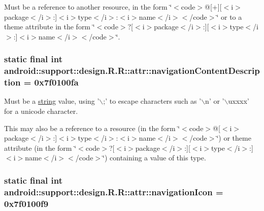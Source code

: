 Must be a reference to another resource, in the form \char`\"{}$<$code$>$@\mbox{[}+\mbox{]}\mbox{[}$<$i$>$package$<$/i$>$:\mbox{]}$<$i$>$type$<$/i$>$:$<$i$>$name$<$/i$>$$<$/code$>$\char`\"{} or to a theme attribute in the form \char`\"{}$<$code$>$?\mbox{[}$<$i$>$package$<$/i$>$:\mbox{]}\mbox{[}$<$i$>$type$<$/i$>$:\mbox{]}$<$i$>$name$<$/i$>$$<$/code$>$\char`\"{}. \hypertarget{classandroid_1_1support_1_1design_1_1_r_1_1attr_b1c90a8dd8e2806366f706aa845291fc}{
\subsubsection[{navigationContentDescription}]{\setlength{\rightskip}{0pt plus 5cm}static final int android::support::design.R.R::attr::navigationContentDescription = 0x7f0100fa}}
\label{classandroid_1_1support_1_1design_1_1_r_1_1attr_b1c90a8dd8e2806366f706aa845291fc}


Must be a \hyperlink{classandroid_1_1support_1_1design_1_1_r_1_1string}{string} value, using '$\backslash$;' to escape characters such as '$\backslash$n' or '$\backslash$uxxxx' for a unicode character. 

This may also be a reference to a resource (in the form \char`\"{}$<$code$>$@\mbox{[}$<$i$>$package$<$/i$>$:\mbox{]}$<$i$>$type$<$/i$>$:$<$i$>$name$<$/i$>$$<$/code$>$\char`\"{}) or theme attribute (in the form \char`\"{}$<$code$>$?\mbox{[}$<$i$>$package$<$/i$>$:\mbox{]}\mbox{[}$<$i$>$type$<$/i$>$:\mbox{]}$<$i$>$name$<$/i$>$$<$/code$>$\char`\"{}) containing a value of this type. \hypertarget{classandroid_1_1support_1_1design_1_1_r_1_1attr_1b9f5cfb09e9d2f55598a6cd06084665}{
\subsubsection[{navigationIcon}]{\setlength{\rightskip}{0pt plus 5cm}static final int android::support::design.R.R::attr::navigationIcon = 0x7f0100f9}}
\label{classandroid_1_1support_1_1design_1_1_r_1_1attr_1b9f5cfb09e9d2f55598a6cd06084665}


